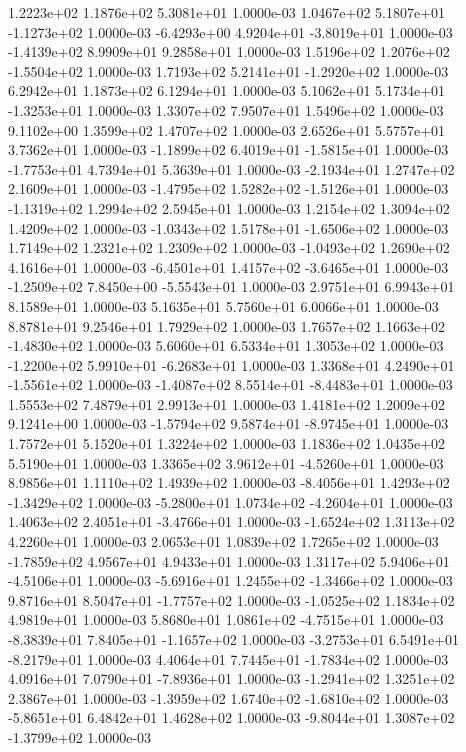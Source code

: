 1.2223e+02 1.1876e+02 5.3081e+01  1.0000e-03
 1.0467e+02  5.1807e+01 -1.1273e+02  1.0000e-03
-6.4293e+00  4.9204e+01 -3.8019e+01  1.0000e-03
-1.4139e+02  8.9909e+01  9.2858e+01  1.0000e-03
 1.5196e+02  1.2076e+02 -1.5504e+02  1.0000e-03
 1.7193e+02  5.2141e+01 -1.2920e+02  1.0000e-03
6.2942e+01 1.1873e+02 6.1294e+01  1.0000e-03
 5.1062e+01  5.1734e+01 -1.3253e+01  1.0000e-03
1.3307e+02 7.9507e+01 1.5496e+02  1.0000e-03
9.1102e+00 1.3599e+02 1.4707e+02  1.0000e-03
2.6526e+01 5.5757e+01 3.7362e+01  1.0000e-03
-1.1899e+02  6.4019e+01 -1.5815e+01  1.0000e-03
-1.7753e+01  4.7394e+01  5.3639e+01  1.0000e-03
-2.1934e+01  1.2747e+02  2.1609e+01  1.0000e-03
-1.4795e+02  1.5282e+02 -1.5126e+01  1.0000e-03
-1.1319e+02  1.2994e+02  2.5945e+01  1.0000e-03
1.2154e+02 1.3094e+02 1.4209e+02  1.0000e-03
-1.0343e+02  1.5178e+01 -1.6506e+02  1.0000e-03
1.7149e+02 1.2321e+02 1.2309e+02  1.0000e-03
-1.0493e+02  1.2690e+02  4.1616e+01  1.0000e-03
-6.4501e+01  1.4157e+02 -3.6465e+01  1.0000e-03
-1.2509e+02  7.8450e+00 -5.5543e+01  1.0000e-03
2.9751e+01 6.9943e+01 8.1589e+01  1.0000e-03
5.1635e+01 5.7560e+01 6.0066e+01  1.0000e-03
8.8781e+01 9.2546e+01 1.7929e+02  1.0000e-03
 1.7657e+02  1.1663e+02 -1.4830e+02  1.0000e-03
5.6060e+01 6.5334e+01 1.3053e+02  1.0000e-03
-1.2200e+02  5.9910e+01 -6.2683e+01  1.0000e-03
 1.3368e+01  4.2490e+01 -1.5561e+02  1.0000e-03
-1.4087e+02  8.5514e+01 -8.4483e+01  1.0000e-03
1.5553e+02 7.4879e+01 2.9913e+01  1.0000e-03
1.4181e+02 1.2009e+02 9.1241e+00  1.0000e-03
-1.5794e+02  9.5874e+01 -8.9745e+01  1.0000e-03
1.7572e+01 5.1520e+01 1.3224e+02  1.0000e-03
1.1836e+02 1.0435e+02 5.5190e+01  1.0000e-03
 1.3365e+02  3.9612e+01 -4.5260e+01  1.0000e-03
8.9856e+01 1.1110e+02 1.4939e+02  1.0000e-03
-8.4056e+01  1.4293e+02 -1.3429e+02  1.0000e-03
-5.2800e+01  1.0734e+02 -4.2604e+01  1.0000e-03
 1.4063e+02  2.4051e+01 -3.4766e+01  1.0000e-03
-1.6524e+02  1.3113e+02  4.2260e+01  1.0000e-03
2.0653e+01 1.0839e+02 1.7265e+02  1.0000e-03
-1.7859e+02  4.9567e+01  4.9433e+01  1.0000e-03
 1.3117e+02  5.9406e+01 -4.5106e+01  1.0000e-03
-5.6916e+01  1.2455e+02 -1.3466e+02  1.0000e-03
 9.8716e+01  8.5047e+01 -1.7757e+02  1.0000e-03
-1.0525e+02  1.1834e+02  4.9819e+01  1.0000e-03
 5.8680e+01  1.0861e+02 -4.7515e+01  1.0000e-03
-8.3839e+01  7.8405e+01 -1.1657e+02  1.0000e-03
-3.2753e+01  6.5491e+01 -8.2179e+01  1.0000e-03
 4.4064e+01  7.7445e+01 -1.7834e+02  1.0000e-03
 4.0916e+01  7.0790e+01 -7.8936e+01  1.0000e-03
-1.2941e+02  1.3251e+02  2.3867e+01  1.0000e-03
-1.3959e+02  1.6740e+02 -1.6810e+02  1.0000e-03
-5.8651e+01  6.4842e+01  1.4628e+02  1.0000e-03
-9.8044e+01  1.3087e+02 -1.3799e+02  1.0000e-03

